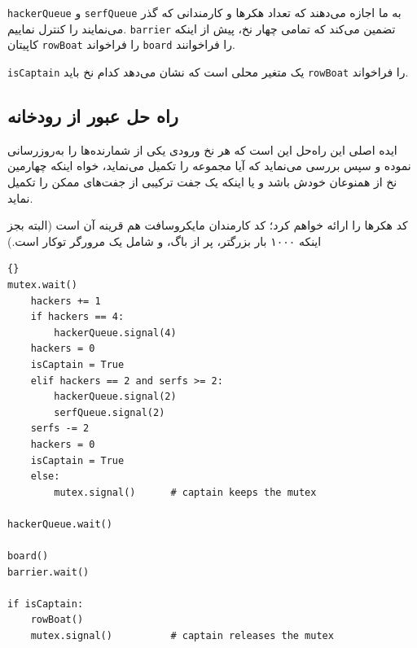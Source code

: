 \documentclass{book}
\newcommand{\clearemptydoublepage}{\newpage\cleardoublepage}
\begin{document}

    {\tt hackerQueue} و {\tt serfQueue}
    به ما اجازه می‌دهند که تعداد هکرها و کارمندانی که گذر می‌نمایند را کنترل نماییم. {\tt barrier} تضمین می‌کند که تمامی چهار نخ، پیش از اینکه 
    کاپیتان  {\tt rowBoat} را فراخواند  {\tt board}  را فراخوانند. 

    {\tt isCaptain} یک متغیر محلی است که نشان می‌دهد کدام نخ باید {\tt rowBoat} را فراخواند. 

\clearemptydoublepage
\subsection {راه حل عبور از رودخانه}

    ایده اصلی این راه‌حل این است که هر نخ ورودی یکی از شمارنده‌ها را به‌روزرسانی نموده و سپس بررسی می‌نماید که آیا مجموعه را تکمیل می‌نماید، خواه 
    اینکه چهارمین نخ از همنوعان خودش باشد و یا اینکه یک جفت ترکیبی از جفت‌‌های ممکن را تکمیل نماید. 

    کد هکرها را ارائه خواهم کرد؛ کد کارمندان مایکروسافت هم قرینه آن است (البته بجز اینکه ۱۰۰۰ بار بزرگتر، پر از باگ، و شامل یک مرورگر توکار است.)

\begin{latin}
\begin{lstlisting}[title=\rl{راه حل عبور از رودخانه}]{}
mutex.wait()
    hackers += 1
    if hackers == 4:
        hackerQueue.signal(4)                
	hackers = 0
	isCaptain = True
    elif hackers == 2 and serfs >= 2:
        hackerQueue.signal(2)                
        serfQueue.signal(2)                  
	serfs -= 2
	hackers = 0
	isCaptain = True
    else:
        mutex.signal()      # captain keeps the mutex

hackerQueue.wait()           

board()
barrier.wait()            

if isCaptain:
    rowBoat()
    mutex.signal()          # captain releases the mutex
\end{lstlisting}
\end{latin}
\end{document}
